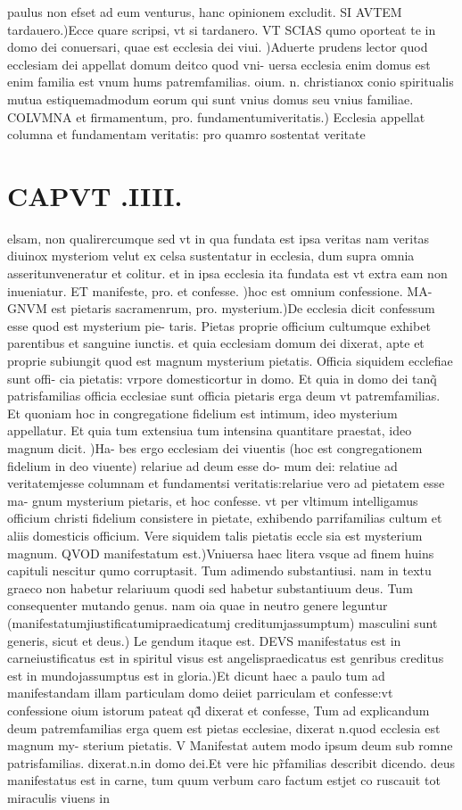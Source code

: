 \documentclass{article}
\begin{document}
\begin{pages}
paulus non efset ad eum venturus, hanc opinionem excludit. SI AVTEM tardauero.)Ecce quare scripsi, vt si tardanero. VT SCIAS qumo oporteat te in domo dei conuersari, quae est ecclesia dei viui. )Aduerte prudens lector quod ecclesiam dei appellat domum deitco quod vni- uersa ecclesia enim domus est enim familia est vnum hums patremfamilias. oium. n. christianox conio spiritualis mutua estiquemadmodum eorum qui sunt vnius domus seu vnius familiae. COLVMNA et firmamentum, pro. fundamentumiveritatis.) Ecclesia appellat columna et fundamentam veritatis: pro quamro sostentat veritate  \pend
\section*{CAPVT .IIII. }
\marginpar{[ p.143 ]}\pstart elsam, non qualirercumque sed vt in qua fundata est ipsa veritas nam veritas diuinox mysteriom velut ex celsa sustentatur in ecclesia, dum supra omnia asseritunveneratur et colitur. et in ipsa ecclesia ita fundata est vt extra eam non inueniatur. ET manifeste, pro. et confesse. )hoc est omnium confessione. MA- GNVM est pietaris sacramenrum, pro. mysterium.)De ecclesia dicit confessum esse quod est mysterium pie- taris. Pietas proprie officium cultumque exhibet parentibus et sanguine iunctis. et quia ecclesiam domum dei dixerat, apte et proprie subiungit quod est magnum mysterium pietatis. Officia siquidem ecclefiae sunt offi- cia pietatis: vrpore domesticortur in domo. Et quia in domo dei tanq̃ patrisfamilias officia ecclesiae sunt officia pietaris erga deum vt patremfamilias. Et quoniam hoc in congregatione fidelium est intimum, ideo mysterium appellatur. Et quia tum extensiua tum intensina quantitare praestat, ideo magnum dicit. )Ha- bes ergo ecclesiam dei viuentis (hoc est congregationem fidelium in deo viuente) relariue ad deum esse do- mum dei: relatiue ad veritatemjesse columnam et fundamentsi veritatis:relariue vero ad pietatem esse ma- gnum mysterium pietaris, et hoc confesse. vt per vltimum intelligamus officium christi fidelium consistere in pietate, exhibendo parrifamilias cultum et aliis domesticis officium. Vere siquidem talis pietatis eccle sia est mysterium magnum. QVOD manifestatum est.)Vniuersa haec litera vsque ad finem huins capituli nescitur qumo corruptasit. Tum adimendo substantiusi. nam in textu graeco non habetur relariuum quodi sed habetur substantiuum deus. Tum consequenter mutando genus. nam oia quae in neutro genere leguntur (manifestatumjiustificatumipraedicatumj creditumjassumptum) masculini sunt generis, sicut et deus.) Le gendum itaque est. DEVS manifestatus est in carneiustificatus est in spiritul visus est angelispraedicatus est genribus creditus est in mundojassumptus est in gloria.)Et dicunt haec a paulo tum ad manifestandam illam particulam domo deiiet parriculam et confesse:vt confessione oium istorum pateat qd̃ dixerat et confesse, Tum ad explicandum deum patremfamilias erga quem est pietas ecclesiae, dixerat n.quod ecclesia est magnum my- sterium pietatis. V Manifestat autem modo ipsum deum sub romne patrisfamilias. dixerat.n.in domo dei.Et vere hic pr̃familias describit dicendo. deus manifestatus est in carne, tum quum verbum caro factum estjet co ruscauit tot miraculis viuens in 
\end{pages}
\end{document}
